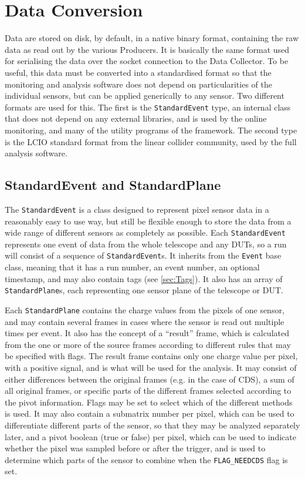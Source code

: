 \section{Data Conversion}
Data are stored on disk, by default, in a native binary format, containing the raw data as read out by the various Producers.
It is basically the same format used for serialising the data over the socket connection to the Data Collector.
To be useful, this data must be converted into a standardised format so that the monitoring and analysis software
does not depend on particularities of the individual sensors, but can be applied generically to any sensor.
Two different formats are used for this. The first is the \texttt{StandardEvent} type,
an internal class that does not depend on any external libraries,
and is used by the online monitoring, and many of the utility programs of the framework.
The second type is the \gls{LCIO} standard format from the linear collider community,
used by the full analysis software.

\subsection{StandardEvent and StandardPlane}
The \texttt{StandardEvent} is a class designed to represent pixel sensor data in a reasonably easy to use way,
but still be flexible enough to store the data from a wide range of different sensors as completely as possible.
Each \texttt{StandardEvent} represents one event of data from the whole telescope and any \glspl{DUT},
so a run will consist of a sequence of \texttt{StandardEvent}s.
It inherits from the \texttt{Event} base class, meaning that it has a run number, an event number, an optional timestamp,
and may also contain tags (see \autoref{sec:Tags}).
It also has an array of \texttt{StandardPlane}s, each representing one sensor plane of the telescope or \gls{DUT}.

Each \texttt{StandardPlane} contains the charge values from the pixels of one sensor,
and may contain several frames in cases where the sensor is read out multiple times per event.
It also has the concept of a ``result'' frame, which is calculated from the one or more of the source frames
according to different rules that may be specified with flags.
The result frame contains only one charge value per pixel, with a positive signal,
and is what will be used for the analysis.
It may consist of either differences between the original frames (e.g. in the case of \gls{CDS}),
a sum of all original frames, or specific parts of the different frames selected according to the pivot information.
Flags may be set to select which of the different methods is used.
It may also contain a submatrix number per pixel, which can be used to differentiate different parts of the sensor,
so that they may be analyzed separately later, and a pivot boolean (true or false) per pixel,
which can be used to indicate whether the pixel was sampled before or after the trigger,
and is used to determine which parts of the sensor to combine when the \texttt{FLAG\_NEEDCDS} flag is set.

